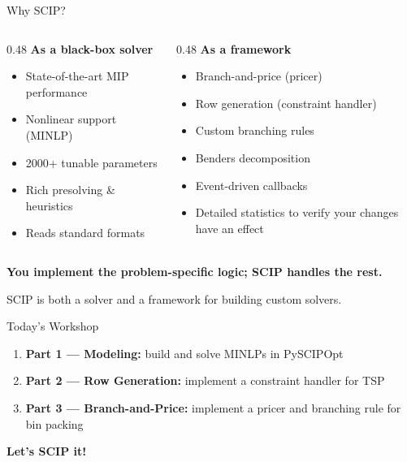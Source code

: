\documentclass{beamer}
\begin{document}
\begin{frame}{Why SCIP?}

\begin{columns}[T]
\begin{column}{0.48\textwidth}
\textbf{As a black-box solver}
\begin{itemize}
  \item State-of-the-art MIP performance
  \item Nonlinear support (MINLP)
  \item 2000+ tunable parameters
  \item Rich presolving \& heuristics
  \item Reads standard formats
\end{itemize}
\end{column}
\begin{column}{0.48\textwidth}
\textbf{As a framework}
\begin{itemize}
  \item Branch-and-price (pricer)
  \item Row generation (constraint handler)
  \item Custom branching rules
  \item Benders decomposition
  \item Event-driven callbacks
  \item Detailed statistics to verify your changes have an effect
\end{itemize}
\end{column}
\end{columns}

\bigskip
\textbf{You implement the problem-specific logic; SCIP handles the rest.}

\bigskip
SCIP is both a solver and a framework for building custom solvers.
\end{frame}

\begin{frame}{Today's Workshop}
\begin{enumerate}
  \item \textbf{Part 1 --- Modeling:} build and solve MINLPs in PySCIPOpt
  \item \textbf{Part 2 --- Row Generation:} implement a constraint handler for TSP
  \item \textbf{Part 3 --- Branch-and-Price:} implement a pricer and branching rule for bin packing
\end{enumerate}

\vfill
\begin{center}
  \LARGE \textbf{Let's SCIP it!}
\end{center}
\end{frame}
\end{document}
